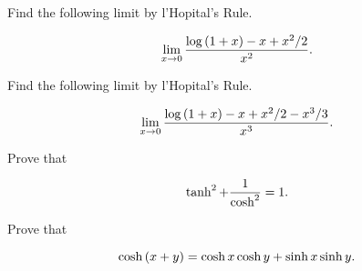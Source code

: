 \documentclass[12pt,letterpaper]{hmcpset}
\newcommand{\pn}[1]{\left( #1 \right)}
\begin{document}
\begin{solution}

\end{solution}

\begin{problem}[18.5.iv]

    Find the following limit by l'Hopital's Rule.

    \[
        \lim_{x\to 0}\frac{\log\pn{1+x} - x + x^2/2}{x^2}.\\
    \]

\end{problem}

\begin{solution}

\end{solution}

\begin{problem}[18.5.vi]

    Find the following limit by l'Hopital's Rule.

    \[
        \lim_{x\to 0}\frac{\log\pn{1+x} - x + x^2/2 - x^3/3}{x^3}.\\
    \]

\end{problem}

\begin{solution}

\end{solution}

\begin{problem}[18.8.b]

    Prove that

    \[
        \tanh^2 + \frac{1}{\cosh^2} = 1.\\
    \]

\end{problem}

\begin{solution}

\end{solution}

\begin{problem}[18.8.d]

    Prove that

    \[
        \cosh\pn{x+y} = \cosh x \cosh y + \sinh x \sinh y.\\
    \]

\end{problem}

\begin{solution}

\end{solution}
\end{document}
